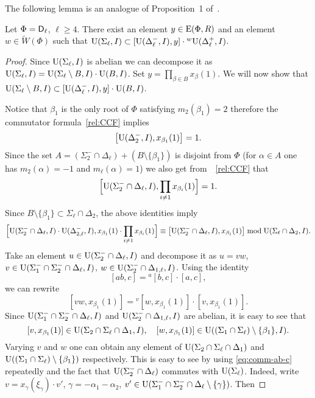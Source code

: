 The following lemma is an analogue of Proposition~1 of~\cite{NikProdDecomp}.
\begin{lemma}\label{lemma:nikolov-type-dl}
Let $\Phi=\mathsf{D}_\ell$, $\ell\geq 4$.
There exist an element $y\in\operatorname{E}(\Phi,R)$ and an element $w\in\widetilde{W}(\Phi)$ such that $\operatorname{U}(\Sigma_\ell, I)\subset[\operatorname{U}(\Delta_\ell^-, I),y]\cdot{}^w\!\operatorname{U}(\Delta_\ell^+, I)$.
\end{lemma}
\begin{proof}
Since $\operatorname{U}(\Sigma_\ell, I)$ is abelian we can decompose it as $\operatorname{U}(\Sigma_\ell, I)=\operatorname{U}(\Sigma_\ell\setminus B, I) \cdot \operatorname{U}(B, I)$. 
Set $y=\prod_{\beta\in B}x_\beta(1)$. We will now show that $\operatorname{U}(\Sigma_\ell\setminus B, I)\subset[\operatorname{U}(\Delta_\ell^-, I),y]\cdot\operatorname{U}(B, I)$.

Notice that $\beta_1$ is the only root of $\Phi$ satisfying $m_2(\beta_1)=2$ therefore the commutator formula~\eqref{rel:CCF} implies
\[ \bigl[\operatorname{U}(\Delta_2^-, I),x_{\beta_1}(1)\bigr]=1. \]
Since the set $A=(\Sigma_2^-\cap\Delta_\ell)+(B\setminus\{\beta_1\})$ is disjoint from $\Phi$ 
(for $\alpha\in A$ one has $m_2(\alpha)=-1$ and $m_\ell(\alpha)=1$)
we also get from~~\eqref{rel:CCF} that
\[\Bigl[\operatorname{U}(\Sigma_2^-\cap\Delta_\ell, I),\prod_{i\neq1}x_{\beta_i}(1)\Bigr]=1. \]
Since $B\setminus\{\beta_1\}\subset\Sigma_\ell\cap\Delta_2$, the above identities imply
\[ \Bigl[ \operatorname{U}(\Sigma_2^-\cap\Delta_\ell, I)\cdot\operatorname{U}(\Delta_{2,\ell}^-, I), x_{\beta_1}(1)\cdot\prod_{i\neq1}x_{\beta_i}(1) \Bigr] \equiv \bigl[ \operatorname{U}(\Sigma_2^-\cap\Delta_\ell, I), x_{\beta_1}(1) \bigr] \bmod \operatorname{U}(\Sigma_\ell\cap\Delta_2, I). \]
Take an element $u\in\operatorname{U}(\Sigma_2^-\cap\Delta_\ell, I)$ and decompose it as $u=vw$, $v\in\operatorname{U}(\Sigma_1^-\cap\Sigma_2^-\cap\Delta_\ell, I)$, $w\in\operatorname{U}(\Sigma_2^-\cap\Delta_{1,\ell}, I)$.
Using the identity
\begin{equation}\label{eq:comm-ab-c}
[ab,c]={}^a[b,c]\cdot[a,c],
\end{equation}
we can rewrite
\[ [vw,x_{\beta_1}(1)] = {}^v[w,x_{\beta_1}(1)]\cdot[v,x_{\beta_1}(1)].  \]
Since $\operatorname{U}(\Sigma_1^-\cap\Sigma_2^-\cap\Delta_\ell, I)$ and $\operatorname{U}(\Sigma_2^-\cap\Delta_{1,\ell}, I)$ are abelian, it is easy to see that
\[ [v,x_{\beta_1}(1)]\in\operatorname{U}(\Sigma_2\cap\Sigma_\ell\cap\Delta_1, I), \quad [w,x_{\beta_1}(1)]\in\operatorname{U}((\Sigma_1\cap\Sigma_\ell)\setminus\{\beta_1\}, I). \]
Varying $v$ and $w$ one can obtain any element of $\operatorname{U}(\Sigma_2\cap\Sigma_\ell\cap\Delta_1)$ and $\operatorname{U}((\Sigma_1\cap\Sigma_\ell)\setminus\{\beta_1\})$ respectively. This is easy to see by using \eqref{eq:comm-ab-c} repeatedly and the fact that $\operatorname{U}(\Sigma_2^-\cap\Delta_\ell)$ commutes with $\operatorname{U}(\Sigma_\ell)$. Indeed, write $v=x_\gamma(\xi_\gamma)\cdot v'$, $\gamma=-\alpha_1-\alpha_2$, $v' \in \operatorname{U}(\Sigma_1^- \cap \Sigma_2^- \cap \Delta_\ell \setminus \{\gamma\})$. Then

\end{proof}
